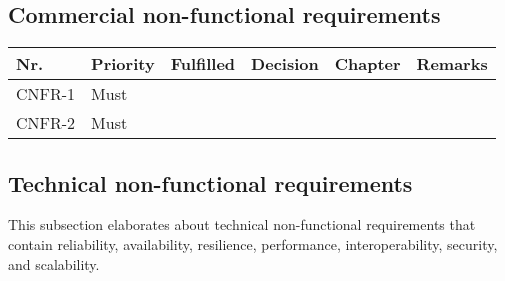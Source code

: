 	\subsection{Commercial non-functional requirements}
	\begin{table}[H]
	\begin{tabular}{lllllL{}}
	
	Nr.    & Priority & Fulfilled & Decision & Chapter & Remarks \\ \hline
	
	CNFR-1 & Must     & ~        & ~ & ~         & ~       \\ \hline
	
	CNFR-2 & Must     & ~        & ~ & ~         & ~       \\ \hline
	
	\end{tabular}
	\end{table}

	\subsection{Technical non-functional requirements}
	This subsection elaborates about technical non-functional requirements that contain reliability, availability, resilience, performance, interoperability, security, and scalability.

